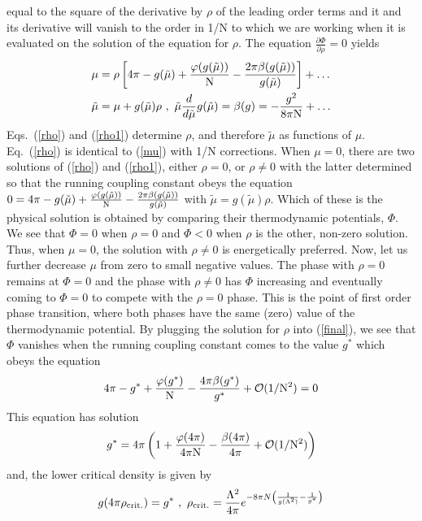 \documentclass[twocolumn,secnumarabic,amssymb, nobibnotes, aps, prd]{revtex4}
\begin{document}
equal to the square of the derivative by $\rho$ of the leading order terms and it and its derivative will vanish to the order
in 1/N to which we are working  when it is evaluated on the 
solution of the equation  for $\rho$.  
The equation  $\frac{\partial\Phi}{\partial\rho}=0$ yields 
 \begin{align}
\mu &= \rho\left[  
 4\pi -{g(\tilde\mu )} +\frac{\varphi(g(\tilde\mu )) }{\rm N}-\frac{2\pi \beta(g(\tilde\mu ))}{g(\tilde\mu )}\right] +\ldots
\label{rho} 
\\   \label{rho1} 
\tilde\mu &=\mu+g(\tilde\mu )\rho~,~\tilde\mu \frac{d}{d\tilde\mu }g(\tilde\mu )=\beta(g)=-\frac{g^2}{8\pi\rm N}+\ldots
\end{align}
Eqs.\  (\ref{rho}) and (\ref{rho1}) determine $\rho$,  and therefore $\tilde\mu$  as functions of $\mu$. 
Eq.\ (\ref{rho}) is identical to (\ref{mu}) with   1/N corrections. When $\mu=0$, there are
two solutions of (\ref{rho}) and (\ref{rho1}), either $\rho=0$,  or $\rho\neq 0$ with the latter determined so that the running coupling constant obeys the equation 
$0= 4\pi -{g(\tilde\mu )} +\frac{\varphi(g(\tilde\mu )) }{\rm N}-\frac{2\pi \beta(g(\tilde\mu ))}{g(\tilde\mu )}$
with $\tilde\mu =g(\tilde\mu )\rho$. Which of these is the physical solution is obtained by comparing their thermodynamic potentials, $\Phi$. We see that $\Phi=0$ when $\rho=0$ and   $\Phi<0$ when $\rho$ is the other, non-zero solution.  Thus, when $\mu=0$, 
the solution with $\rho\neq 0$ is energetically preferred.   Now,
let us further decrease $\mu$ from zero to small negative values.  The phase with $\rho=0$ remains at $\Phi=0$ and the
phase with $\rho\neq0$ has $\Phi$ increasing and eventually coming to $\Phi=0$ to compete with the $\rho=0$ phase.  
This is the point of first order phase transition, where both phases have the same (zero) value of the thermodynamic potential.  By plugging the solution for $\rho$ into (\ref{final}), we see that $\Phi$ vanishes when the running coupling constant comes to the value $g^*$ which
obeys the equation  
\begin{align}\label{gcrit}
 4\pi-{g^*} +\frac{\varphi(g^*) }{\rm N}- \frac{4\pi \beta(g^*)}{g^*}+{\mathcal O}(1/{\rm N}^2)=0
 \end{align}
 This equation has solution
  \begin{align}
 g^*=4\pi\left( 1+\frac{\varphi(4\pi) }{4\pi\rm N}- \frac{\beta(4\pi)}{4\pi}+{\mathcal O}(1/{\rm N}^2)\right)
 \label{gstar}
   \end{align}
 and, the lower critical density is given by 
 \begin{align}\label{rhocrit1}
g(4\pi\rho_{\rm crit.})=g^* ~,~ \rho_{\rm crit.} = \frac{\Lambda^2}{4\pi} e^{-8\pi N\left( \frac{1}{g(\Lambda^2)}-\frac{1}{g^{*}}\right)}
\end{align}
\end{document}
